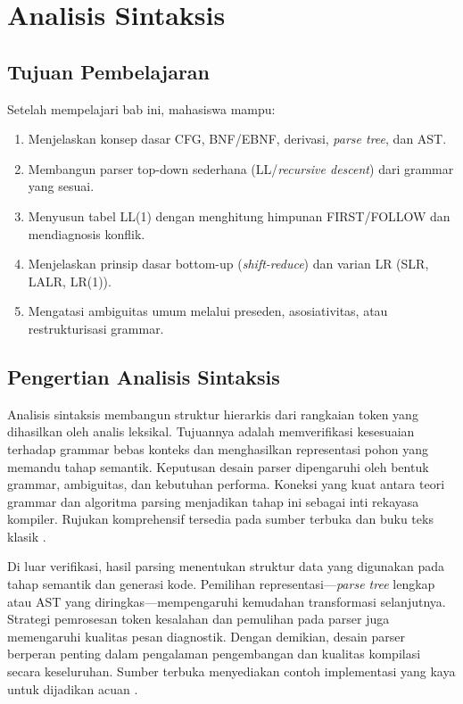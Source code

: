 \documentclass[../main.tex]{subfiles}
\begin{document}
\chapter{Analisis Sintaksis}

\section{Tujuan Pembelajaran}
Setelah mempelajari bab ini, mahasiswa mampu:
\begin{enumerate}[label=\alph*)]
  \item Menjelaskan konsep dasar CFG, BNF/EBNF, derivasi, \emph{parse tree}, dan AST.
  \item Membangun parser top-down sederhana (LL/\emph{recursive descent}) dari grammar yang sesuai.
  \item Menyusun tabel LL(1) dengan menghitung himpunan FIRST/FOLLOW dan mendiagnosis konflik.
  \item Menjelaskan prinsip dasar bottom-up (\emph{shift-reduce}) dan varian LR (SLR, LALR, LR(1)).
  \item Mengatasi ambiguitas umum melalui preseden, asosiativitas, atau restrukturisasi grammar.
\end{enumerate}

\section{Pengertian Analisis Sintaksis}
Analisis sintaksis membangun struktur hierarkis dari rangkaian token yang dihasilkan oleh analis leksikal. Tujuannya adalah memverifikasi kesesuaian terhadap grammar bebas konteks dan menghasilkan representasi pohon yang memandu tahap semantik. Keputusan desain parser dipengaruhi oleh bentuk grammar, ambiguitas, dan kebutuhan performa. Koneksi yang kuat antara teori grammar dan algoritma parsing menjadikan tahap ini sebagai inti rekayasa kompiler. Rujukan komprehensif tersedia pada sumber terbuka dan buku teks klasik \citep{Mogensen2010,Wirth1996}.

Di luar verifikasi, hasil parsing menentukan struktur data yang digunakan pada tahap semantik dan generasi kode. Pemilihan representasi—\emph{parse tree} lengkap atau AST yang diringkas—mempengaruhi kemudahan transformasi selanjutnya. Strategi pemrosesan token kesalahan dan pemulihan pada parser juga memengaruhi kualitas pesan diagnostik. Dengan demikian, desain parser berperan penting dalam pengalaman pengembangan dan kualitas kompilasi secara keseluruhan. Sumber terbuka menyediakan contoh implementasi yang kaya untuk dijadikan acuan \citep{CS143}.
\end{document}
